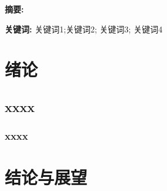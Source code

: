 \documentclass[]{theme}
\begin{document}
                 

\makecover
\makesm
\ChineseAbstract

\textbf{摘\quad 要:}




\textbf{关键词:} 关键词1;\quad  关键词2; \quad 关键词3; \quad  关键词4

\newpage




\newpage



\setcounter{page}{1}  
\tableofcontents                                     %
\newpage

\makeFBQD
\newpage
\section{绪论}
\subsection{xxxx}
\subsubsection{xxxx}



\newpage
\section*{结论与展望}
\end{document}
